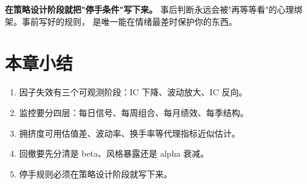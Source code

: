 \begin{keybox}[最重要的一条]
\textbf{在策略设计阶段就把"停手条件"写下来。}
事后判断永远会被"再等等看"的心理绑架。事前写好的规则，
是唯一能在情绪最差时保护你的东西。
\end{keybox}

\section{本章小结}

\begin{enumerate}
  \item 因子失效有三个可观测阶段：IC 下降、波动放大、IC 反向。
  \item 监控要分四层：每日信号、每周组合、每月绩效、每季结构。
  \item 拥挤度可用估值差、波动率、换手率等代理指标近似估计。
  \item 回撤要先分清是 beta、风格暴露还是 alpha 衰减。
  \item 停手规则必须在策略设计阶段就写下来。
\end{enumerate}
